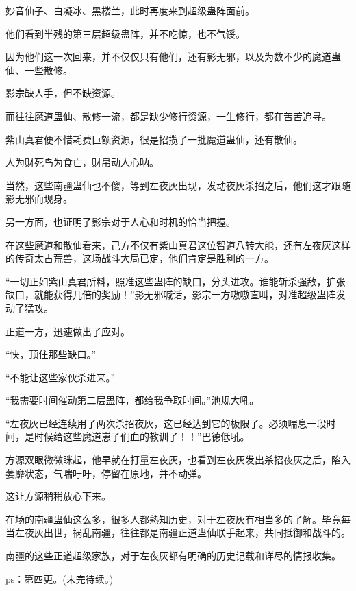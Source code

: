 \begin{this_body}
妙音仙子、白凝冰、黑楼兰，此时再度来到超级蛊阵面前。

他们看到半残的第三层超级蛊阵，并不吃惊，也不气馁。

因为他们这一次回来，并不仅仅只有他们，还有影无邪，以及为数不少的魔道蛊仙、一些散修。

影宗缺人手，但不缺资源。

而往往魔道蛊仙、散修一流，都是缺少修行资源，一生修行，都在苦苦追寻。

紫山真君便不惜耗费巨额资源，很是招揽了一批魔道蛊仙，还有散仙。

人为财死鸟为食亡，财帛动人心呐。

当然，这些南疆蛊仙也不傻，等到左夜灰出现，发动夜灰杀招之后，他们这才跟随影无邪而现身。

另一方面，也证明了影宗对于人心和时机的恰当把握。

在这些魔道和散仙看来，己方不仅有紫山真君这位智道八转大能，还有左夜灰这样的传奇太古荒兽，这场战斗大局已定，他们肯定是胜利的一方。

“一切正如紫山真君所料，照准这些蛊阵的缺口，分头进攻。谁能斩杀强敌，扩张缺口，就能获得几倍的奖励！”影无邪喊话，影宗一方嗷嗷直叫，对准超级蛊阵发动了猛攻。

正道一方，迅速做出了应对。

“快，顶住那些缺口。”

“不能让这些家伙杀进来。”

“我需要时间催动第二层蛊阵，都给我争取时间。”池规大吼。

“左夜灰已经连续用了两次杀招夜灰，这已经达到它的极限了。必须喘息一段时间，是时候给这些魔道崽子们血的教训了！！”巴德低吼。

方源双眼微微眯起，他早就在打量左夜灰，也看到左夜灰发出杀招夜灰之后，陷入萎靡状态，气喘吁吁，停留在原地，并不动弹。

这让方源稍稍放心下来。

在场的南疆蛊仙这么多，很多人都熟知历史，对于左夜灰有相当多的了解。毕竟每当左夜灰出世，祸乱南疆，往往都是南疆正道蛊仙联手起来，共同抵御和战斗的。

南疆的这些正道超级家族，对于左夜灰都有明确的历史记载和详尽的情报收集。

ps：第四更。(未完待续。)

\end{this_body}

